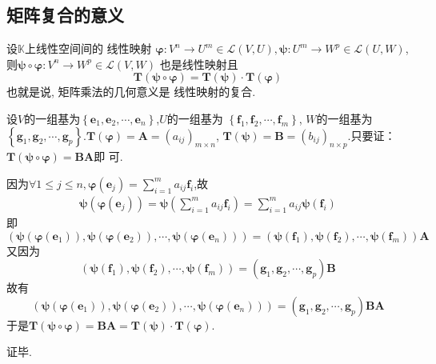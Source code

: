 \subsection{矩阵复合的意义}
\begin{formal}
\begin{theorem}[矩阵乘法的几何意义]\label{thm:矩阵乘法的几何意义}
    设$\mathbb{K}$上线性空间间的
    线性映射
    $\bm{\varphi}:V^n\longrightarrow
    U^m \in \mathcal{L}\left(
        V,U
    \right),\bm{\psi}:U^m\longrightarrow
    W^p
    \in \mathcal{L}\left(U,W\right)$,则$\bm{\psi}\circ \bm{\varphi}
    :V^n\longrightarrow W^p \in 
    \mathcal{L}\left(V,W\right)$
    也是线性映射且
    \[
    \bm{T}\left(\bm{\psi\circ\varphi}\right)
    =\bm{T}\left(\bm{\psi}\right)\cdot
    \bm{T}\left(\bm{\varphi}\right)
    \]
    也就是说,
    矩阵乘法的几何意义是
    线性映射的复合.
\end{theorem}
\begin{Proof}
设$V$的一组基为$\left\{
    \bm{e}_1,\bm{e}_2,\cdots,\bm{e}_n
\right\}$,$U$的一组基为
$\left\{\bm{f}_1,\bm{f}_2,\cdots,\bm{f}_m
\right\}$,
$W$的一组基为$\left\{
    \bm{g}_1,\bm{g}_2,\cdots,\bm{g}_p
\right\}$.$\bm{T}\left(\bm{\varphi}\right)=\bm{A}=
\left(a_{ij}\right)_{m\times n}$,
$\bm{T}\left(\bm{\psi}\right)=\bm{B}=\left(b_{ij}\right)_{n\times
 p}$.只要证：$\bm{T}\left(\bm{\psi}\circ
 \bm{\varphi}\right)=\bm{BA}$即
 可.

 因为$\displaystyle 
 \forall 1\leqslant j\leqslant n,
 \bm{\varphi}\left(\bm{e}_j\right)=
 \sum_{i=1}^{m}a_{ij}\bm{f}_i$,故
 \begin{align*}
    \bm{\psi}\left(\bm{\varphi}\left(\bm{e}_j\right)\right)
    =\bm{\psi}\left(\sum_{i=1}^{m}a_{ij}\bm{f}
    _i\right)=\sum_{i=1}^{m}a_{ij}\bm{\psi}\left(
        \bm{f}_i
    \right)
 \end{align*}
 即
 \[
 \left(\bm{\psi}\left(\bm{\varphi}\left(\bm{e}_1\right)\right),
 \bm{\psi}\left(\bm{\varphi}\left(\bm{e}_2\right)\right),
 \cdots,\bm{\psi}\left(\bm{\varphi}\left(
    \bm{e}_n
 \right)\right)\right)=
\left(
    \bm{\psi}\left(\bm{f}_1\right),\bm{\psi}\left(\bm{f}_2\right),\cdots,
    \bm{\psi}\left(\bm{f}_m\right)
\right)\bm{A}
 \]
 又因为
 \[
 \left(
    \bm{\psi}\left(\bm{f}_1\right),\bm{\psi}\left(\bm{f}_2\right),\cdots,
    \bm{\psi}\left(\bm{f}_m\right)
\right)=\left(\bm{g}_1,\bm{g}_2,\cdots,\bm{g}_p\right)\bm{B}
 \]
 故有
 \[
 \left(\bm{\psi}\left(\bm{\varphi}\left(\bm{e}_1\right)\right),
 \bm{\psi}\left(\bm{\varphi}\left(\bm{e}_2\right)\right),
 \cdots,\bm{\psi}\left(\bm{\varphi}\left(
    \bm{e}_n
 \right)\right)\right)=
 \left(\bm{g}_1,\bm{g}_2,\cdots,\bm{g}_p\right)\bm{B}
 \bm{A}
 \]
于是$\bm{T}\left(\bm{\psi}\circ \bm{\varphi}\right)=\bm{BA}=\bm{T}\left(\bm{\psi}\right)\cdot\bm{T}\left(\bm{\varphi}\right)$.

证毕.
\end{Proof}
\end{formal}

